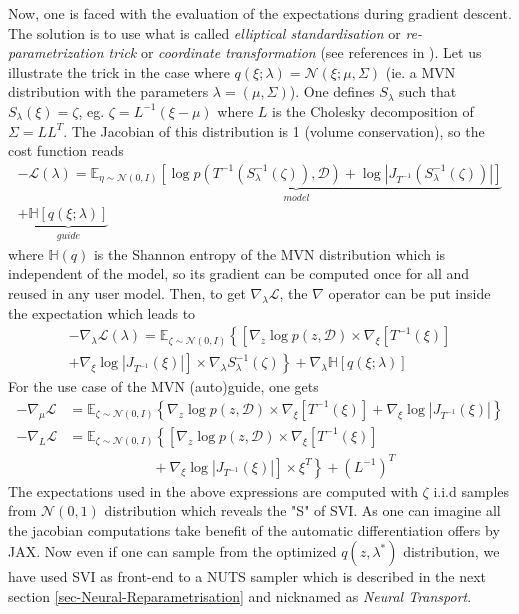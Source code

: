 \documentclass[twocolumn,twocolappendix,nofootinbib]{openjournal}
\newcommand{\nn}{\nonumber}
\begin{document}
Now, one is faced with the evaluation of the expectations during gradient descent. The solution is to use what is called \textit{elliptical standardisation} or \textit{re-parametrization trick} or \textit{coordinate transformation} (see references in \citep{2015arXiv150603431K}). Let us illustrate the trick in the case where $q(\xi; \lambda) = \mathcal{N}(\xi; \mu, \Sigma)$ (ie. a MVN distribution with the parameters $\lambda=(\mu, \Sigma)$). One defines $S_\lambda$ such that $S_\lambda(\xi)=\zeta$, eg. $\zeta = L^{-1}(\xi-\mu)$ where $L$ is the Cholesky decomposition of $\Sigma=LL^T$. The Jacobian of this distribution is 1 (volume conservation), so the cost function reads
\begin{multline}
-\mathcal{L}(\lambda) = \underbrace{\mathbb{E}_{\eta\sim \mathcal{N}(0,I)}\left[ \log p(T^{-1}(S_\lambda^{-1}(\zeta)),\mathcal{D}) + \log |J_{T^{-1}}(S_\lambda^{-1}(\zeta))| \right]}_{model} \\ + \underbrace{\mathbb{H}[q(\xi;\lambda)]}_{guide}
\label{eq-loss-svi-3}
\end{multline}
where $\mathbb{H}(q)$ is the Shannon entropy of the MVN distribution which is independent of the model, so its gradient can be computed once for all and reused in any user model. Then,
to get $\nabla_\lambda \mathcal{L}$, the $\nabla$ operator can be put inside the expectation which leads to
\begin{multline}
-\nabla_\lambda\mathcal{L}(\lambda) = \mathbb{E}_{\zeta\sim \mathcal{N}(0,I)}\left\{
\left[ \nabla_z \log p(z,\mathcal{D}) \times \nabla_\xi[T^{-1}(\xi)] \right. \right. \\
+ \left. \left. \nabla_\xi \log|J_{T^{-1}}(\xi)| \right] \times \nabla_\lambda S_\lambda^{-1}(\zeta)
\right\}
+ \nabla_\lambda \mathbb{H}[q(\xi;\lambda)]
\label{eq-loss-svi-4}
\end{multline}
For the use case of the MVN (auto)guide, one gets
\begin{align}
-\nabla_\mu \mathcal{L} &= \mathbb{E}_{\zeta\sim \mathcal{N}(0,I)}\left\{
\nabla_z \log p(z,\mathcal{D}) \times \nabla_\xi[T^{-1}(\xi)]
+ \nabla_\xi \log|J_{T^{-1}}(\xi)|
\right\} \nn \\
-\nabla_L \mathcal{L} &= \mathbb{E}_{\zeta\sim \mathcal{N}(0,I)}\left\{
\left[ \nabla_z \log p(z,\mathcal{D}) \times \nabla_\xi[T^{-1}(\xi)] \right.\right. \nn\\
&\left. \left. \qquad\qquad\qquad + \nabla_\xi \log|J_{T^{-1}}(\xi)| \right] \times \xi^T 
\right\}+ (L^{-1})^T
\end{align}
The expectations used in the above expressions are computed with $\zeta$ i.i.d samples from $\mathcal{N}(0,1)$ distribution which reveals the "S" of SVI. As one can imagine all the jacobian computations take benefit of the automatic differentiation offers by JAX. Now even if one can sample from the optimized  $q(z,\lambda^\ast)$ distribution, we have used SVI as front-end to a NUTS sampler which is described in the next section \ref{sec-Neural-Reparametrisation} and nicknamed as \textit{Neural Transport}.
%
\end{document}
